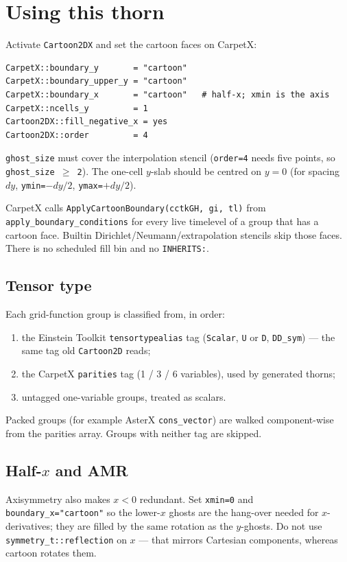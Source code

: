\section{Using this thorn}

Activate \texttt{Cartoon2DX} and set the cartoon faces on CarpetX:
\begin{verbatim}
CarpetX::boundary_y       = "cartoon"
CarpetX::boundary_upper_y = "cartoon"
CarpetX::boundary_x       = "cartoon"   # half-x; xmin is the axis
CarpetX::ncells_y         = 1
Cartoon2DX::fill_negative_x = yes
Cartoon2DX::order         = 4
\end{verbatim}
\texttt{ghost\_size} must cover the interpolation stencil
(\texttt{order=4} needs five points, so \texttt{ghost\_size $\ge$ 2}).
The one-cell $y$-slab should be centred on $y=0$ (for spacing $dy$,
\texttt{ymin=$-dy/2$}, \texttt{ymax=$+dy/2$}).

CarpetX calls \texttt{ApplyCartoonBoundary(cctkGH, gi, tl)} from
\texttt{apply\_boundary\_conditions} for every live timelevel of a group
that has a cartoon face. Builtin Dirichlet/Neumann/extrapolation
stencils skip those faces. There is no scheduled fill bin and no
\texttt{INHERITS:}.

\subsection{Tensor type}

Each grid-function group is classified from, in order:
\begin{enumerate}
\item the Einstein Toolkit \texttt{tensortypealias} tag
  (\texttt{Scalar}, \texttt{U} or \texttt{D}, \texttt{DD\_sym}) ---
  the same tag old \texttt{Cartoon2D} reads;
\item the CarpetX \texttt{parities} tag (1 / 3 / 6 variables), used by
  generated thorns;
\item untagged one-variable groups, treated as scalars.
\end{enumerate}
Packed groups (for example AsterX \texttt{cons\_vector}) are walked
component-wise from the parities array. Groups with neither tag are
skipped.

\subsection{Half-$x$ and AMR}

Axisymmetry also makes $x<0$ redundant. Set \texttt{xmin=0} and
\texttt{boundary\_x="cartoon"} so the lower-$x$ ghosts are the hang-over
needed for $x$-derivatives; they are filled by the same rotation as the
$y$-ghosts. Do not use \texttt{symmetry\_t::reflection} on $x$ --- that
mirrors Cartesian components, whereas cartoon rotates them.

